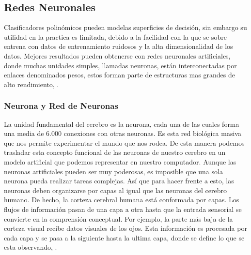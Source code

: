 \subsection{Redes Neuronales}

    Clasificadores polinómicos pueden modelas superficies de decisión, sin embargo su utilidad en la practica es limitada, debido a la facilidad con la que se sobre entrena con datos de entrenamiento ruidosos y la alta dimensionalidad de los datos. Mejores resultados pueden obtenerse con redes neuronales artificiales, donde muchas unidades simples, llamadas neuronas, están interconectadas por enlaces denominados pesos, estos forman parte de estructuras mas grandes de alto rendimiento, \cite{kubat2015introduction}.



    \subsubsection{Neurona y Red de Neuronas}

    La unidad fundamental del cerebro es la neurona, cada una de las cuales forma una media de 6.000 conexiones con otras neuronas. Es esta red biológica masiva que nos permite experimentar el mundo que nos rodea. De esta manera podemos trasladar esta concepto funcional de las neuronas de nuestro cerebro en un modelo artificial que podemos representar en nuestro computador. Aunque las neuronas artificiales pueden ser muy poderosas, es imposible que una sola neurona pueda realizar tareas complejas. Así que para hacer frente a esto, las neuronas deben organizarse por capas al igual que las neuronas del cerebro humano. De hecho, la corteza cerebral humana está conformada por capas. Los flujos de información pasan de una capa a otra hasta que la entrada sensorial se convierte en la comprensión conceptual. Por ejemplo, la parte más baja de la corteza visual recibe datos visuales de los ojos. Esta información es procesada por cada capa y se pasa a la siguiente hasta la ultima capa, donde se define lo que se esta observando, \cite{dlBook}.

